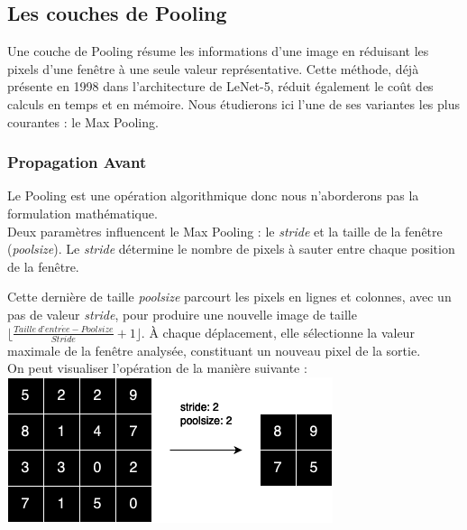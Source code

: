 \begin{multicols}{2}
\subsection{Les couches de Pooling}
Une couche de Pooling résume les informations d’une image en réduisant les pixels 
d’une fenêtre à une seule valeur représentative. Cette méthode, déjà présente en 1998 dans l'architecture de 
LeNet-5, réduit également le coût des calculs en temps et en mémoire. Nous étudierons 
ici l’une de ses variantes les plus courantes :  le Max Pooling. 

\subsubsection{Propagation Avant}

Le Pooling est une opération algorithmique donc nous n'aborderons pas
la formulation mathématique.\\

Deux paramètres influencent le Max Pooling : le \textit{stride} et 
la taille de la fenêtre (\textit{poolsize}). Le \textit{stride} détermine 
le nombre de pixels à sauter entre chaque position de la fenêtre.

Cette dernière de taille \textit{poolsize} parcourt les pixels en lignes 
et colonnes, avec un pas de valeur \textit{stride}, pour produire une nouvelle 
image de taille $\lfloor \frac{Taille \ d’entr \acute{e}e - Poolsize}{Stride} + 1 \rfloor$. 
À chaque déplacement, elle sélectionne la valeur maximale de la fenêtre 
analysée, constituant un nouveau pixel de la sortie.\\

On peut visualiser l'opération de la manière suivante : \\

\includegraphics[width=\columnwidth]{images/forwardpooling.png}
\hfill\break


\end{multicols}
